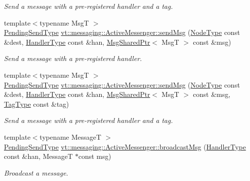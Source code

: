 \begin{DoxyCompactItemize}
\begin{DoxyCompactList}\small\item\em Send a message with a pre-\/registered handler and a tag. \end{DoxyCompactList}\item 
{\footnotesize template$<$typename MsgT $>$ }\\\hyperlink{structvt_1_1messaging_1_1_active_messenger_a3626a6ca76d8ad4ec7c3b47a2c70d3a8}{Pending\+Send\+Type} \hyperlink{group__preregister_ga78d906520ffe21829f5177f20fbc839d}{vt\+::messaging\+::\+Active\+Messenger\+::send\+Msg} (\hyperlink{namespacevt_a866da9d0efc19c0a1ce79e9e492f47e2}{Node\+Type} const \&dest, \hyperlink{namespacevt_af64846b57dfcaf104da3ef6967917573}{Handler\+Type} const \&han, \hyperlink{structvt_1_1messaging_1_1_msg_shared_ptr}{Msg\+Shared\+Ptr}$<$ MsgT $>$ const \&msg)
\begin{DoxyCompactList}\small\item\em Send a message with a pre-\/registered handler. \end{DoxyCompactList}\item 
{\footnotesize template$<$typename MsgT $>$ }\\\hyperlink{structvt_1_1messaging_1_1_active_messenger_a3626a6ca76d8ad4ec7c3b47a2c70d3a8}{Pending\+Send\+Type} \hyperlink{group__preregister_ga26272a5a0f43d34981433cfbe63a5f5e}{vt\+::messaging\+::\+Active\+Messenger\+::send\+Msg} (\hyperlink{namespacevt_a866da9d0efc19c0a1ce79e9e492f47e2}{Node\+Type} const \&dest, \hyperlink{namespacevt_af64846b57dfcaf104da3ef6967917573}{Handler\+Type} const \&han, \hyperlink{structvt_1_1messaging_1_1_msg_shared_ptr}{Msg\+Shared\+Ptr}$<$ MsgT $>$ const \&msg, \hyperlink{namespacevt_a84ab281dae04a52a4b243d6bf62d0e52}{Tag\+Type} const \&tag)
\begin{DoxyCompactList}\small\item\em Send a message with a pre-\/registered handler and a tag. \end{DoxyCompactList}\item 
{\footnotesize template$<$typename MessageT $>$ }\\\hyperlink{structvt_1_1messaging_1_1_active_messenger_a3626a6ca76d8ad4ec7c3b47a2c70d3a8}{Pending\+Send\+Type} \hyperlink{group__preregister_gad206aeeb8c0ffe4af72fb758c83a7b78}{vt\+::messaging\+::\+Active\+Messenger\+::broadcast\+Msg} (\hyperlink{namespacevt_af64846b57dfcaf104da3ef6967917573}{Handler\+Type} const \&han, MessageT $\ast$const msg)
\begin{DoxyCompactList}\small\item\em Broadcast a message. \end{DoxyCompactList}\item 

\end{DoxyCompactItemize}
